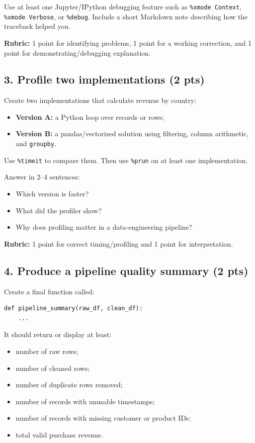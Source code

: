 \documentclass[10pt]{article}
\begin{document}
Use at least one Jupyter/IPython debugging feature such as
\texttt{\%xmode Context}, \texttt{\%xmode Verbose}, or \texttt{\%debug}.
Include a short Markdown note describing how the traceback helped you.

\textbf{Rubric:} 1 point for identifying problems, 1 point for a working
correction, and 1 point for demonstrating/debugging explanation.

\subsection*{3. Profile two implementations (2 pts)}
Create two implementations that calculate revenue by country:

\begin{itemize}
    \item \textbf{Version A:} a Python loop over records or rows;
    \item \textbf{Version B:} a pandas/vectorized solution using filtering,
    column arithmetic, and \texttt{groupby}.
\end{itemize}

Use \texttt{\%timeit} to compare them. Then use \texttt{\%prun} on at least
one implementation.

Answer in 2--4 sentences:
\begin{itemize}
    \item Which version is faster?
    \item What did the profiler show?
    \item Why does profiling matter in a data-engineering pipeline?
\end{itemize}

\textbf{Rubric:} 1 point for correct timing/profiling and 1 point for
interpretation.

\subsection*{4. Produce a pipeline quality summary (2 pts)}
Create a final function called:

\begin{lstlisting}
def pipeline_summary(raw_df, clean_df):
    ...
\end{lstlisting}

It should return or display at least:

\begin{itemize}
    \item number of raw rows;
    \item number of cleaned rows;
    \item number of duplicate rows removed;
    \item number of records with unusable timestamps;
    \item number of records with missing customer or product IDs;
    \item total valid purchase revenue.
\end{itemize}
\end{document}

